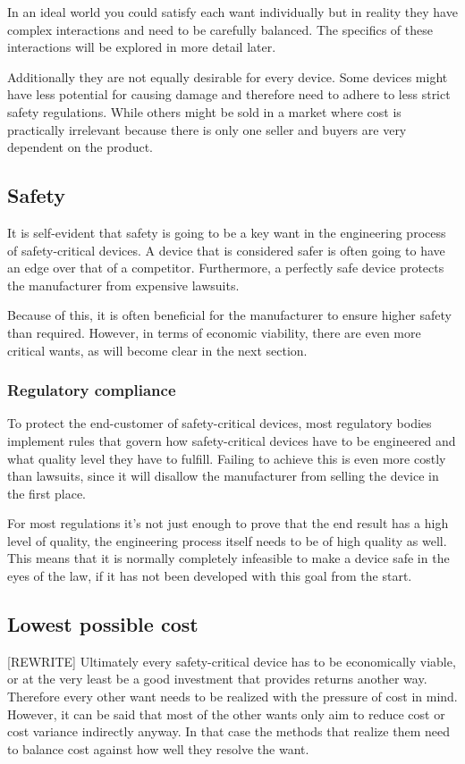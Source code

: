 In an ideal world you could satisfy each want individually but in reality they have complex interactions and need to be carefully balanced. The specifics of these interactions will be explored in more detail later.

Additionally they are not equally desirable for every device. Some devices might have less potential for causing damage and therefore need to adhere to less strict safety regulations. While others might be sold in a market where cost is practically irrelevant because there is only one seller and buyers are very dependent on the product. 

\subsection{Safety}
It is self-evident that safety is going to be a key want in the engineering process of safety-critical devices. A device that is considered safer is often going to have an edge over that of a competitor. Furthermore, a perfectly safe device protects the manufacturer from expensive lawsuits.

Because of this, it is often beneficial for the manufacturer to ensure higher safety than required. However, in terms of economic viability, there are even more critical wants, as will become clear in the next section.

\paragraph{}

\subsubsection{Regulatory compliance}
To protect the end-customer of safety-critical devices, most regulatory bodies implement rules that govern how safety-critical devices have to be engineered and what quality level they have to fulfill.
Failing to achieve this is even more costly than lawsuits, since it will disallow the manufacturer from selling the device in the first place. 

For most regulations it’s not just enough to prove that the end result has a high level of quality, the engineering process itself needs to be of high quality as well. This means that it is normally completely infeasible to make a device safe in the eyes of the law, if it has not been developed with this goal from the start.

\subsection{Lowest possible cost}
[REWRITE]
Ultimately every safety-critical device has to be economically viable, or at the very least be a good investment that provides returns another way. 
Therefore every other want needs to be realized with the pressure of cost in mind. However, it can be said that most of the other wants only aim to reduce cost or cost variance indirectly anyway. In that case the methods that realize them need to balance cost against how well they resolve the want.

